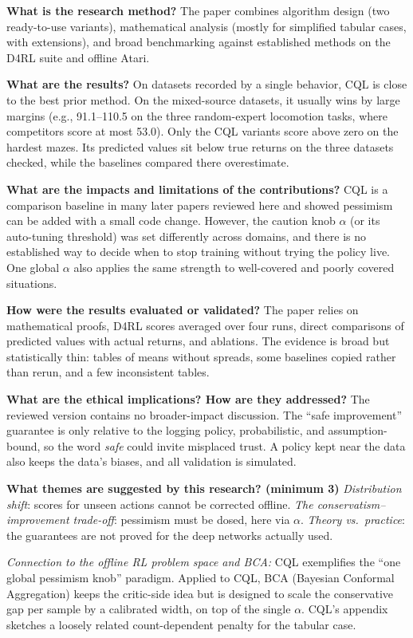 \documentclass[11pt]{article}
\newcommand{\q}[2]{\item \textbf{#1} #2}
\newcommand{\tiein}[1]{\par\smallskip\noindent\emph{Connection to the offline RL problem space and BCA:} #1\par\medskip}
\begin{document}
\begin{qna}
\q{What is the research method?}
The paper combines algorithm design (two ready-to-use variants), mathematical analysis (mostly for simplified tabular cases, with extensions), and broad benchmarking against established methods on the D4RL suite and offline Atari.

\q{What are the results?}
On datasets recorded by a single behavior, CQL is close to the best prior method. On the mixed-source datasets, it usually wins by large margins (e.g., 91.1--110.5 on the three random-expert locomotion tasks, where competitors score at most 53.0). Only the CQL variants score above zero on the hardest mazes. Its predicted values sit below true returns on the three datasets checked, while the baselines compared there overestimate.

\q{What are the impacts and limitations of the contributions?}
CQL is a comparison baseline in many later papers reviewed here and showed pessimism can be added with a small code change. However, the caution knob $\alpha$ (or its auto-tuning threshold) was set differently across domains, and there is no established way to decide when to stop training without trying the policy live. One global $\alpha$ also applies the same strength to well-covered and poorly covered situations.

\q{How were the results evaluated or validated?}
The paper relies on mathematical proofs, D4RL scores averaged over four runs, direct comparisons of predicted values with actual returns, and ablations. The evidence is broad but statistically thin: tables of means without spreads, some baselines copied rather than rerun, and a few inconsistent tables.

\q{What are the ethical implications? How are they addressed?}
The reviewed version contains no broader-impact discussion. The ``safe improvement'' guarantee is only relative to the logging policy, probabilistic, and assumption-bound, so the word \emph{safe} could invite misplaced trust. A policy kept near the data also keeps the data's biases, and all validation is simulated.

\q{What themes are suggested by this research? (minimum 3)}
\emph{Distribution shift}: scores for unseen actions cannot be corrected offline. \emph{The conservatism--improvement trade-off}: pessimism must be dosed, here via $\alpha$. \emph{Theory vs.\ practice}: the guarantees are not proved for the deep networks actually used.

\end{qna}
\tiein{CQL exemplifies the ``one global pessimism knob'' paradigm. Applied to CQL, BCA (Bayesian Conformal Aggregation) keeps the critic-side idea but is designed to scale the conservative gap per sample by a calibrated width, on top of the single $\alpha$. CQL's appendix sketches a loosely related count-dependent penalty for the tabular case.}
\end{document}
